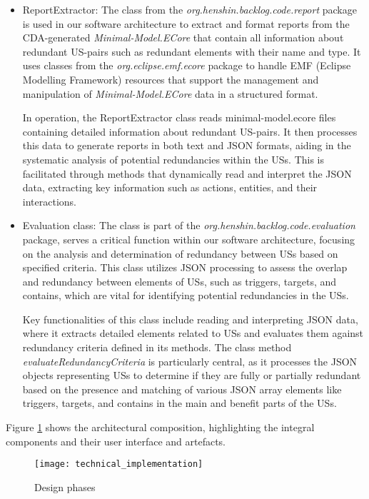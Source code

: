 \begin{itemize}
	\item ReportExtractor: The class from the \textit{org.henshin.backlog.code.report} package is used in our software architecture to extract and format reports from the CDA-generated \textit{Minimal-Model.ECore} that contain all information about redundant US-pairs such as redundant elements with their name and type. It uses classes from the \textit{org.eclipse.emf.ecore} package to handle EMF (Eclipse Modelling Framework) resources that support the management and manipulation of \textit{Minimal-Model.ECore} data in a structured format.
	
	In operation, the ReportExtractor class reads minimal-model.ecore files containing detailed information about redundant US-pairs. It then processes this data to generate reports in both text and JSON formats, aiding in the systematic analysis of potential redundancies within the USs. This is facilitated through methods that dynamically read and interpret the JSON data, extracting key information such as actions, entities, and their interactions.
	
	\item Evaluation class: The class is part of the \textit{org.henshin.backlog.code.evaluation} package, serves a critical function within our software architecture, focusing on the analysis and determination of redundancy between USs based on specified criteria. This class utilizes JSON processing to assess the overlap and redundancy between elements of USs, such as triggers, targets, and contains, which are vital for identifying potential redundancies in the USs.
	
	Key functionalities of this class include reading and interpreting JSON data, where it extracts detailed elements related to USs and evaluates them against redundancy criteria defined in its methods. The class method \textit{evaluateRedundancyCriteria} is particularly central, as it processes the JSON objects representing USs to determine if they are fully or partially redundant based on the presence and matching of various JSON array elements like triggers, targets, and contains in the main and benefit parts of the USs.
	
	\end{itemize}
Figure \ref{fig:technical_implementation} shows the architectural composition, highlighting the integral components and their user interface and artefacts.
\begin{figure}[h]
	\centering 
	\texttt{[image: technical\_implementation]}
	\caption{Design phases}\label{fig:technical_implementation}
\end{figure}

